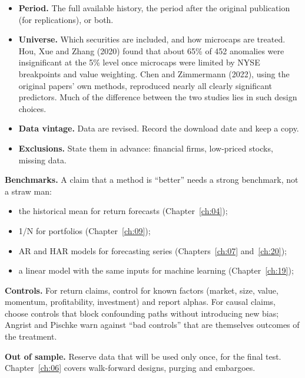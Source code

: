 \begin{itemize}
  \item \textbf{Period.} The full available history, the period after the original publication (for replications), or both.
  \item \textbf{Universe.} Which securities are included, and how microcaps are treated. Hou, Xue and Zhang (2020) found that about 65\% of 452 anomalies were insignificant at the 5\% level once microcaps were limited by NYSE breakpoints and value weighting. Chen and Zimmermann (2022), using the original papers' own methods, reproduced nearly all clearly significant predictors. Much of the difference between the two studies lies in such design choices.
  \item \textbf{Data vintage.} Data are revised. Record the download date and keep a copy.
  \item \textbf{Exclusions.} State them in advance: financial firms, low-priced stocks, missing data.
\end{itemize}

\textbf{Benchmarks.} A claim that a method is ``better'' needs a strong benchmark, not a straw man:

\begin{itemize}
  \item the historical mean for return forecasts (Chapter~\ref{ch:04});
  \item 1/N for portfolios (Chapter~\ref{ch:09});
  \item AR and HAR models for forecasting series (Chapters~\ref{ch:07} and~\ref{ch:20});
  \item a linear model with the same inputs for machine learning (Chapter~\ref{ch:19});
\end{itemize}

\textbf{Controls.} For return claims, control for known factors (market, size, value, momentum, profitability, investment) and report alphas. For causal claims, choose controls that block confounding paths without introducing new bias; Angrist and Pischke warn against ``bad controls'' that are themselves outcomes of the treatment.

\textbf{Out of sample.} Reserve data that will be used only once, for the final test. Chapter~\ref{ch:06} covers walk-forward designs, purging and embargoes.

